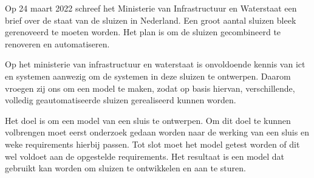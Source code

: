 \documentclass[../verslag.tex]{subfiles}
\begin{document}
Op 24 maart 2022 schreef het Ministerie van Infrastructuur en Waterstaat een brief over de staat van de sluizen in Nederland. Een groot aantal sluizen bleek gerenoveerd te moeten worden. Het plan is om de sluizen gecombineerd te renoveren en automatiseren.

Op het ministerie van infrastructuur en waterstaat is onvoldoende kennis van ict en systemen aanwezig om de systemen in deze sluizen te ontwerpen. Daarom vroegen zij ons om een model te maken, zodat op basis hiervan, verschillende, volledig geautomatiseerde sluizen gerealiseerd kunnen worden.

Het doel is om een model van een sluis te ontwerpen. Om dit doel te kunnen volbrengen moet eerst onderzoek gedaan worden naar de werking van een sluis en weke requirements hierbij passen. Tot slot moet het model getest worden of dit wel voldoet aan de opgestelde requirements. Het resultaat is een model dat gebruikt kan worden om sluizen te ontwikkelen en aan te sturen.
\end{document}
